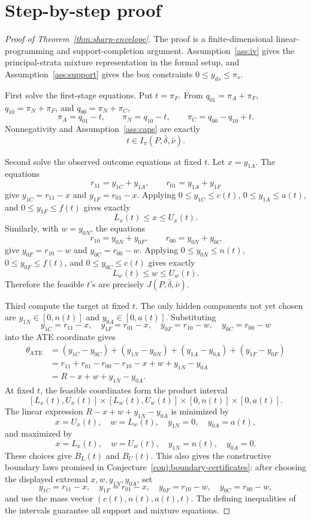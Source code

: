 \documentclass[11pt]{article}
\theoremstyle{definition}
\theoremstyle{plain}
\theoremstyle{remark}
\begin{document}
\section{Step-by-step proof}
\begin{proof}[Proof of Theorem~\ref{thm:sharp-envelope}]
The proof is a finite-dimensional linear-programming and support-completion
argument.  Assumption~\ref{ass:iv} gives the principal-strata mixture
representation in the formal setup, and Assumption~\ref{ass:support} gives
the box constraints \(0\le y_{ds}\le\pi_s\).

First solve the first-stage equations.  Put \(t=\pi_F\).  From
\(q_{01}=\pi_A+\pi_F\), \(q_{10}=\pi_N+\pi_F\), and
\(q_{00}=\pi_N+\pi_C\),
\[
\pi_A=q_{01}-t,\qquad
\pi_N=q_{10}-t,\qquad
\pi_C=q_{00}-q_{10}+t.
\]
Nonnegativity and Assumption~\ref{ass:caps} are exactly
\[
t\in I_\pi(P,\bar\delta,\bar\nu).
\]

Second solve the observed outcome equations at fixed \(t\).  Let
\(x=y_{1A}\).  The equations
\[
r_{11}=y_{1C}+y_{1A},\qquad r_{01}=y_{1A}+y_{1F}
\]
give \(y_{1C}=r_{11}-x\) and \(y_{1F}=r_{01}-x\).  Applying
\(0\le y_{1C}\le c(t)\), \(0\le y_{1A}\le a(t)\), and
\(0\le y_{1F}\le f(t)\) gives exactly
\[
L_x(t)\le x\le U_x(t).
\]
Similarly, with \(w=y_{0N}\), the equations
\[
r_{10}=y_{0N}+y_{0F},\qquad r_{00}=y_{0N}+y_{0C}
\]
give \(y_{0F}=r_{10}-w\) and \(y_{0C}=r_{00}-w\).  Applying
\(0\le y_{0N}\le n(t)\), \(0\le y_{0F}\le f(t)\), and
\(0\le y_{0C}\le c(t)\) gives exactly
\[
L_w(t)\le w\le U_w(t).
\]
Therefore the feasible \(t\)'s are precisely \(J(P,\bar\delta,\bar\nu)\).

Third compute the target at fixed \(t\).  The only hidden components not yet
chosen are \(y_{1N}\in[0,n(t)]\) and \(y_{0A}\in[0,a(t)]\).  Substituting
\[
y_{1C}=r_{11}-x,\quad y_{1F}=r_{01}-x,\quad
y_{0F}=r_{10}-w,\quad y_{0C}=r_{00}-w
\]
into the ATE coordinate gives
\[
\begin{aligned}
\theta_{\mathrm{ATE}}
&=(y_{1C}-y_{0C})+(y_{1N}-y_{0N})
 +(y_{1A}-y_{0A})+(y_{1F}-y_{0F})\\
&=r_{11}+r_{01}-r_{00}-r_{10}-x+w+y_{1N}-y_{0A}\\
&=R-x+w+y_{1N}-y_{0A}.
\end{aligned}
\]
At fixed \(t\), the feasible coordinates form the product interval
\[
[L_x(t),U_x(t)]\times [L_w(t),U_w(t)]
\times [0,n(t)]\times[0,a(t)].
\]
The linear expression \(R-x+w+y_{1N}-y_{0A}\) is minimized by
\[
x=U_x(t),\quad w=L_w(t),\quad y_{1N}=0,\quad y_{0A}=a(t),
\]
and maximized by
\[
x=L_x(t),\quad w=U_w(t),\quad y_{1N}=n(t),\quad y_{0A}=0.
\]
These choices give \(B_L(t)\) and \(B_U(t)\).  This also gives the constructive
boundary laws promised in Conjecture~\ref{conj:boundary-certificates}: after
choosing the displayed extremal \(x,w,y_{1N},y_{0A}\), set
\[
y_{1C}=r_{11}-x,\quad y_{1F}=r_{01}-x,\quad
y_{0F}=r_{10}-w,\quad y_{0C}=r_{00}-w,
\]
and use the mass vector \((c(t),n(t),a(t),t)\).  The defining inequalities of
the intervals guarantee all support and mixture equations.


\end{proof}
\end{document}
